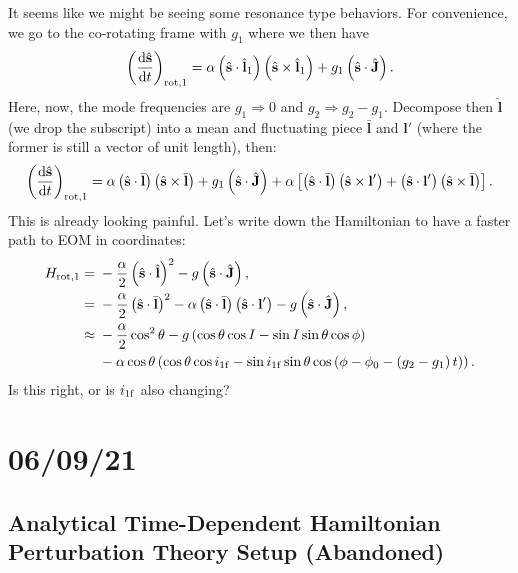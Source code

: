 \documentclass[11pt,
        usenames, %
        dvipsnames %
    ]{article}
\newcommand*{\rd}[2]{\frac{\mathrm{d}#1}{\mathrm{d}#2}}
\newcommand*{\bm}[1]{\boldsymbol{\mathbf{#1}}}
\newcommand*{\uv}[1]{\hat{\bm{#1}}}
\newcommand*{\p}[1]{\left(#1\right)}
\newcommand*{\s}[1]{\left[#1\right]}
\begin{document}
It seems like we might be seeing some resonance type behaviors. For convenience,
we go to the co-rotating frame with $g_1$ where we then have
\begin{equation}
    \p{\rd{\uv{s}}{t}}_{\rm rot, 1}
        = \alpha\p{\uv{s} \cdot \uv{l}_1}\p{\uv{s} \times \uv{l}_1}
            + g_1\p{\uv{s} \cdot \uv{J}}.
\end{equation}
Here, now, the mode frequencies are $g_1 \Rightarrow 0$ and $g_2 \Rightarrow g_2
- g_1$. Decompose then $\uv{l}$ (we drop the subscript) into a mean and fluctuating
piece $\bar{\bm{l}}$ and $\bm{l}'$ (where the former is still a vector of unit
length), then:
\begin{equation}
    \p{\rd{\uv{s}}{t}}_{\rm rot, 1}
        = \alpha\p{\uv{s} \cdot \bar{\bm{l}}}\p{\uv{s} \times \bar{\bm{l}}}
            + g_1\p{\uv{s} \cdot \uv{J}}
            + \alpha\s{
                \p{\uv{s} \cdot \bar{\bm{l}}}
                \p{\uv{s} \times \bm{l}'} +
                \p{\uv{s} \cdot \bm{l}'}
                \p{\uv{s} \times \bar{\bm{l}}}
            }.
\end{equation}
This is already looking painful. Let's write down the Hamiltonian to have a
faster path to EOM in coordinates:
\begin{align}
    H_{\rm rot, 1} ={}& -\frac{\alpha}{2}\p{\uv{s} \cdot \uv{l}}^2
            - g\p{\uv{s} \cdot \uv{J}},\\
        ={}& -\frac{\alpha}{2}\p{\uv{s} \cdot \bar{\bm{l}}}^2
            - \alpha\p{\uv{s} \cdot \bar{\bm{l}}}
                \p{\uv{s} \cdot \bm{l}'}
            - g\p{\uv{s} \cdot \uv{J}},\\
        \approx{}& -\frac{\alpha}{2}\cos^2\theta
            - g\p{\cos \theta \cos I - \sin I \sin \theta \cos \phi}\nonumber\\
        & - \alpha \cos \theta\p{
            \cos \theta \cos i_{\rm 1f}
            - \sin i_{\rm 1f} \sin \theta \cos \p{\phi - \phi_0 - \p{g_2 -
            g_1}t}}.
\end{align}
Is this right, or is $i_{\rm 1f}$ also changing?

\section{06/09/21}

\subsection{Analytical Time-Dependent Hamiltonian Perturbation Theory Setup
(Abandoned)}
\end{document}
